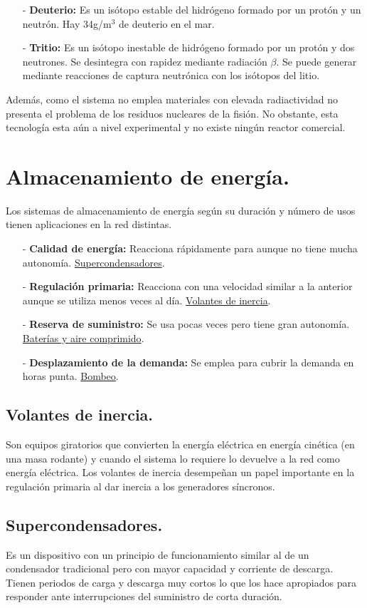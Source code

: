 \begin{itemize}
	\item [-] \textbf{Deuterio:} Es un isótopo estable del hidrógeno formado por un protón y un neutrón. Hay 34g/m$^3$ de deuterio en el mar.
	\item [-]\textbf{Tritio:}  Es un isótopo inestable de hidrógeno formado por un protón y dos neutrones. Se desintegra con rapidez mediante radiación $\beta$. Se puede generar mediante reacciones de captura neutrónica con los isótopos del litio.
\end{itemize} 

Además, como el sistema no emplea materiales con elevada radiactividad no presenta el problema de los residuos nucleares de la fisión. No obstante, esta tecnología esta aún a nivel experimental y no existe ningún reactor comercial.
\section{Almacenamiento de energía.}
Los sistemas de almacenamiento de energía según su duración y número de usos tienen aplicaciones en la red distintas.
\begin{itemize}
	\item [-] \textbf{Calidad de energía:} Reacciona rápidamente para aunque no tiene mucha autonomía. \underline{Supercondensadores}.
	\item [-] \textbf{Regulación primaria:} Reacciona con una velocidad similar a la anterior aunque se utiliza menos veces al día. \underline{Volantes de inercia}. 
	\item [-] \textbf{Reserva de suministro:} Se usa pocas veces pero tiene gran autonomía. \underline{Baterías y aire comprimido}.
	\item [-] \textbf{Desplazamiento de la demanda:} Se emplea para cubrir la demanda en horas punta. \underline{Bombeo}.
\end{itemize}

\subsection{Volantes de inercia.}
Son equipos giratorios que convierten la energía eléctrica en energía cinética (en una masa rodante) y cuando el sistema lo requiere lo devuelve a la red como energía eléctrica. Los volantes de inercia desempeñan un papel importante en la regulación primaria al dar inercia a los generadores síncronos.
\subsection{Supercondensadores.}
Es un dispositivo con un principio de funcionamiento similar al de un condensador tradicional pero con mayor capacidad y corriente de descarga. Tienen periodos de carga y descarga muy cortos lo que los hace apropiados para responder ante interrupciones del suministro de corta duración.
